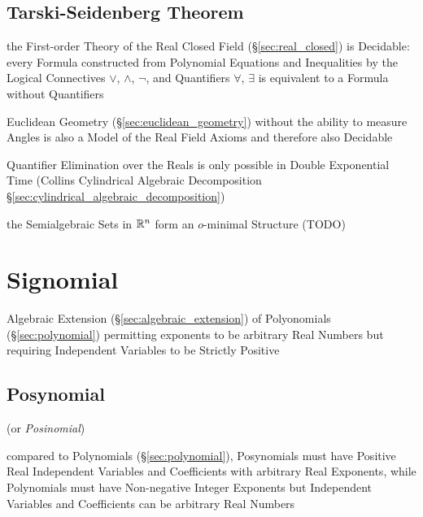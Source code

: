 \subsection{Tarski-Seidenberg Theorem}\label{sec:tarski_seidenberg}

the First-order Theory of the Real Closed Field (\S\ref{sec:real_closed}) is
Decidable: every Formula constructed from Polynomial Equations and Inequalities
by the Logical Connectives $\vee$, $\wedge$, $\neg$, and Quantifiers $\forall$,
$\exists$ is equivalent to a Formula without Quantifiers

Euclidean Geometry (\S\ref{sec:euclidean_geometry}) without the ability to
measure Angles is also a Model of the Real Field Axioms and therefore also
Decidable

Quantifier Elimination over the Reals is only possible in Double Exponential
Time (Collins Cylindrical Algebraic Decomposition
\S\ref{sec:cylindrical_algebraic_decomposition})

the Semialgebraic Sets in $\mathbb{R}^n$ form an $o$-minimal Structure (TODO)



\section{Signomial}\label{sec:signomial}

Algebraic Extension (\S\ref{sec:algebraic_extension}) of Polyonomials
(\S\ref{sec:polynomial}) permitting exponents to be arbitrary Real Numbers but
requiring Independent Variables to be Strictly Positive



\subsection{Posynomial}\label{sec:posynomial}

(or \emph{Posinomial})

compared to Polynomials (\S\ref{sec:polynomial}), Posynomials must have Positive
Real Independent Variables and Coefficients with arbitrary Real Exponents, while
Polynomials must have Non-negative Integer Exponents but Independent Variables
and Coefficients can be arbitrary Real Numbers

